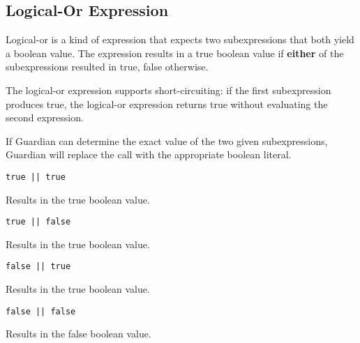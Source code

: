 
\subsection{Logical-Or Expression}
{
	Logical-or is a kind of expression that expects two subexpressions that
	both yield a boolean value. The expression results in a true boolean value
	if \textbf{either} of the subexpressions resulted in true, false otherwise.
	
	The logical-or expression supports short-circuiting: if the first
	subexpression produces true, the logical-or expression returns true
	without evaluating the second expression.
	
	If Guardian can determine the exact value of the two given subexpressions,
	Guardian will replace the call with the appropriate boolean literal.
	
	\begin{itemize}
	{
		\item \texttt{true || true}
		
			Results in the true boolean value.
			
		\item \texttt{true || false}
		
			Results in the true boolean value.
			
		\item \texttt{false || true}
		
			Results in the true boolean value.
			
		\item \texttt{false || false}
		
			Results in the false boolean value.
	}
	\end{itemize}
}
